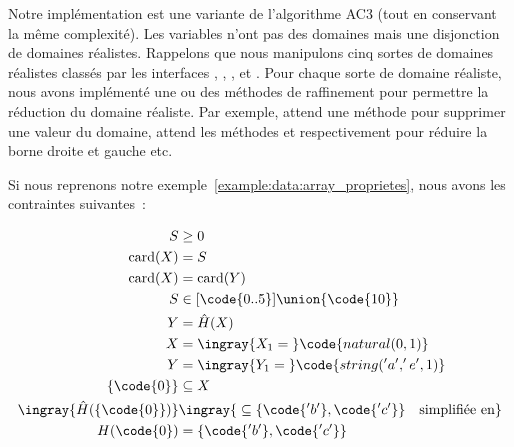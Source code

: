 Notre implémentation est une variante de l'algorithme AC3 (tout en conservant la
même complexité). Les variables n'ont pas des domaines mais une disjonction de
domaines réalistes. Rappelons que nous manipulons cinq sortes de domaines
réalistes classés par les interfaces , ,
,  et . Pour chaque sorte de
domaine réaliste, nous avons implémenté une ou des méthodes de raffinement pour
permettre la réduction du domaine réaliste. Par exemple,  attend
une méthode  pour supprimer une valeur du domaine,
 attend les méthodes  et 
respectivement pour réduire la borne droite et gauche etc.

\begin{example}

Si nous reprenons notre exemple~\ref{example:data:array_proprietes}, nous avons
les contraintes suivantes~:

\begin{align*}
%
S & \geq 0 \\
%
\mathrm{card}(X) & = S \\
%
\mathrm{card}(X) & = \mathrm{card}(Y) \\
%
S & \in [\code{0..5}] \union \{\code{10}\} \\
%
Y & = \hat{H}(X) \\
%
X & = \ingray{X_1 =\;} \code{natural(0, 1)} \\
%
Y & = \ingray{Y_1 =\;} \code{string('a', 'e', 1)} \\
%
\{\code{0}\} & \subseteq X \\
%
\ingray{\hat{H}(\{\code{0}\})} & \ingray{\;\subseteq \{\code{'b'}, \code{'c'}\}
                                 \quad \text{simplifiée en}} \\
%
H(\code{0}) & = \{\code{'b'}, \code{'c'}\}
%
\end{align*}


\end{example}
